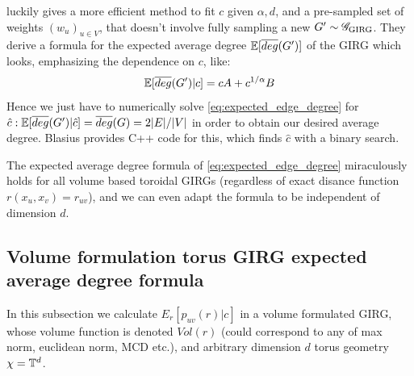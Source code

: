 \cite{blasius2022efficiently} luckily gives a more efficient method to fit $c$ given $\alpha, d$, and a pre-sampled set of weights $(w_u)_{u \in V}$, that doesn't involve fully sampling a new $G' \sim \mathscr{G}_{\mathrm{GIRG}}$. They derive a formula for the expected average degree $\mathbb{E}[\overline{deg}(G')]$ of the GIRG which looks, emphasizing the dependence on $c$, like:
\begin{equation}
    \label{eq:expected_edge_degree}
    \mathbb{E}[\overline{deg}(G') | c] = c A + c^{1/\alpha} B
\end{equation}
Hence we just have to numerically solve \cref{eq:expected_edge_degree} for $\hat{c}: \mathbb{E}[\overline{deg}(G') | \hat{c}] = \overline{deg}(G) = 2 |E|/|V|$ in order to obtain our desired average degree. Blasius provides C++ code for this, which finds $\hat{c}$ with a binary search.

The expected average degree formula of \cref{eq:expected_edge_degree} miraculously holds for all volume based toroidal GIRGs (regardless of exact disance function $r(x_u, x_v) = r_{uv}$), and we can even adapt the formula to be independent of dimension $d$.

\subsection{Volume formulation torus GIRG expected average degree formula}
\label{subsec:average_degree_formula}

In this subsection we calculate $E_r[p_{uv}(r) | c]$ in a volume formulated GIRG, whose volume function is denoted $Vol(r)$ (could correspond to any of max norm, euclidean norm, MCD etc.), and arbitrary dimension $d$ torus geometry $\chi = \mathbb{T}^d$.

